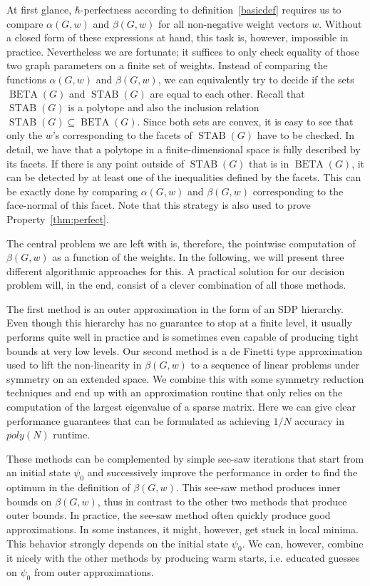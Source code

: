 \documentclass[
12pt,
prx,
aps,
reprint,
a4paper,
longbibliograph,
nofootinbib,
nobibnotes,
superscriptaddress
]{revtex4-2}
\theoremstyle{definition}
\def\stab{\operatorname{STAB}}
\def\be{\operatorname{BETA}}
\begin{document}
At first glance,  $\hbar$-perfectness according to definition~\ref{basicdef} requires us to compare $\alpha(G,w)$ and $\beta(G,w)$ for all non-negative weight vectors $w$. Without a closed form of these expressions at hand, this task is, however, impossible in practice. 
Nevertheless we are fortunate; it suffices to only check  equality of those two graph parameters on a finite set of  weights. 
Instead of comparing the functions $\alpha(G,w)$ and $\beta(G,w)$, we can equivalently try to decide if the sets $\be(G)$ and $ \stab(G)$ are equal to each other. 
Recall that $\stab(G)$ is a polytope and also the inclusion relation $\stab(G)\subseteq \be(G)$. Since both sets are convex, it is easy to see that only the $w$'s corresponding to the facets of $\stab(G)$ have to be checked. In detail, we have that a polytope in a finite-dimensional space is fully described by  its facets. If there is any point outside of $\stab(G)$ that is in $\be(G)$,  it can be detected by at least one of the inequalities defined by the facets. This can be exactly done by comparing  $\alpha(G,w)$ and $\beta(G,w)$ corresponding to the face-normal of this facet.
Note that this strategy is also used to prove Property~\ref{thm:perfect}.

The central problem we are left with is, therefore, the pointwise computation of  $\beta(G,w)$ as a function of the weights. 
In the following, we will present  three different algorithmic approaches for this. A practical solution for our decision problem will, in the end, consist of a clever combination of all those methods. 

The first method is an outer approximation in the form of an SDP hierarchy. Even though this hierarchy has no guarantee to stop at a finite level, it usually  performs quite well in practice and is sometimes even capable of producing tight bounds at very low levels. 
Our second method is a de Finetti type approximation used to lift the non-linearity in  $\beta(G,w)$  to a sequence of linear problems under symmetry on an extended space. We combine this with some symmetry reduction techniques and end up with an approximation routine that only relies on the computation of the largest eigenvalue of a sparse matrix. Here we can give clear performance guarantees that can be formulated as achieving $1/N$ accuracy in $poly(N)$ runtime.

These methods can be complemented by simple see-saw iterations that start from an initial state $\psi_0$ and successively improve the performance in order to find the optimum in the definition of $\beta(G,w)$. This see-saw method produces inner bounds on $\beta(G,w)$, thus in contrast to the other two methods that produce outer bounds. In practice, the see-saw method often quickly produce good approximations. In some instances, it might, however, get stuck in local minima. This behavior strongly depends on the initial state $\psi_0$. We can, however, combine it nicely with the other methods by producing warm starts, i.e. educated guesses on $\psi_0$ from outer approximations. 
\end{document}
